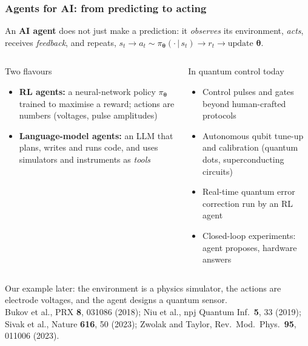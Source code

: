 \documentclass{beamer}
\begin{document}
\begin{frame}
\frametitle{Agents for AI: from predicting to acting}
\small
\begin{block}{}
An \textbf{AI agent} does not just make a prediction: it \emph{observes} its environment, \emph{acts}, receives \emph{feedback}, and repeats,
$s_t \rightarrow a_t\sim\pi_{\bm{\theta}}(\cdot\,|\,s_t) \rightarrow r_t \rightarrow \text{update } \bm{\theta}$.
\end{block}
\begin{columns}[t]
\begin{block}{Two flavours}
\begin{itemize}
\item \textbf{RL agents:} a neural-network policy $\pi_{\bm{\theta}}$ trained to maximise a reward; actions are numbers (voltages, pulse amplitudes)
\item \textbf{Language-model agents:} an LLM that plans, writes and runs code, and uses simulators and instruments as \emph{tools}
\end{itemize}
\end{block}
\begin{block}{In quantum control today}
\begin{itemize}
\item Control pulses and gates beyond human-crafted protocols
\item Autonomous qubit tune-up and calibration (quantum dots, superconducting circuits)
\item Real-time quantum error correction run by an RL agent
\item Closed-loop experiments: agent proposes, hardware answers
\end{itemize}
\end{block}
\end{columns}
\vspace{1mm}
{\scriptsize Our example later: the environment is a physics simulator, the actions are electrode voltages, and the agent designs a quantum sensor.\\ Bukov et al., PRX \textbf{8}, 031086 (2018); Niu et al., npj Quantum Inf.\ \textbf{5}, 33 (2019); Sivak et al., Nature \textbf{616}, 50 (2023); Zwolak and Taylor, Rev.\ Mod.\ Phys.\ \textbf{95}, 011006 (2023).}
\end{frame}
\end{document}
